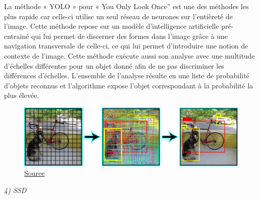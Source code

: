 \documentclass[a4paper,12pt]{article} %
\begin{document}
La méthode « YOLO » pour « You Only Look Once” est une des méthodes les plus rapide car celle-ci utilise un seul réseau de neurones sur l’entièreté de l’image. Cette méthode repose sur un modèle d’intelligence artificielle pré-entrainé qui lui permet de discerner des formes dans l’image grâce à une navigation transversale de celle-ci, ce qui lui permet d'introduire une notion de contexte de l'image. Cette méthode exécute aussi son analyse avec une multitude d’échelles différentes pour un objet donné afin de ne pas discriminer les différences d’échelles. L’ensemble de l’analyse résulte en une liste de probabilité d’objets reconnus et l’algorithme expose l’objet correspondant à la probabilité la plus élevée.\newline
\begin{figure}[h] %
  \centering %
  \includegraphics[scale=0.20]{YOLO.png} %
  \caption{\href{https://pjreddie.com/darknet/yolov2/}{Source} }
\end{figure}
\newpage
\textit{4)	SSD}\newline
\end{document}
